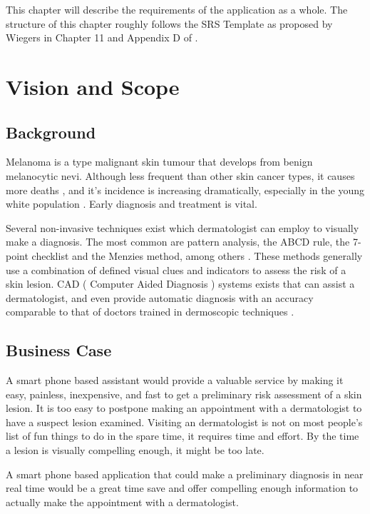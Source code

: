 This chapter will describe the requirements of the application as a whole. The structure of this chapter roughly follows the SRS Template as proposed by Wiegers in Chapter 11 and Appendix D of \cite{wiegers2013software}.

\section{Vision and Scope}

    \subsection{Background}

        Melanoma is a type malignant skin tumour that develops from benign melanocytic nevi. Although less frequent than other skin cancer types, it causes more deaths \cite{cancer_gov_skin}, and it’s incidence is increasing dramatically, especially in the young white population \cite{S_ez_2013}. Early diagnosis and treatment is vital.

Several non-invasive techniques exist which dermatologist can employ to visually make a diagnosis. The most common are pattern analysis, the ABCD rule, the 7-point checklist and the Menzies method, among others \cite{marghoob2004atlas}. These methods generally use a combination of defined visual clues and indicators to assess the risk of a skin lesion. CAD ( Computer Aided Diagnosis ) systems exists that can assist a dermatologist, and even provide automatic diagnosis with an accuracy comparable to that of doctors trained in dermoscopic techniques \cite{Filho2015}.

    \subsection{Business Case}

        A smart phone based assistant would provide a valuable service by making it easy, painless, inexpensive, and fast to get a preliminary risk assessment of a skin lesion. It is too easy to postpone making an appointment with a dermatologist to have a suspect lesion examined. Visiting an dermatologist is not on most people’s list of fun things to do in the spare time, it requires time and effort. By the time a lesion is visually compelling enough, it might be too late.

A smart phone based application that could make a preliminary diagnosis in near real time would be a great time save and offer compelling enough information to actually make the appointment with a dermatologist.

